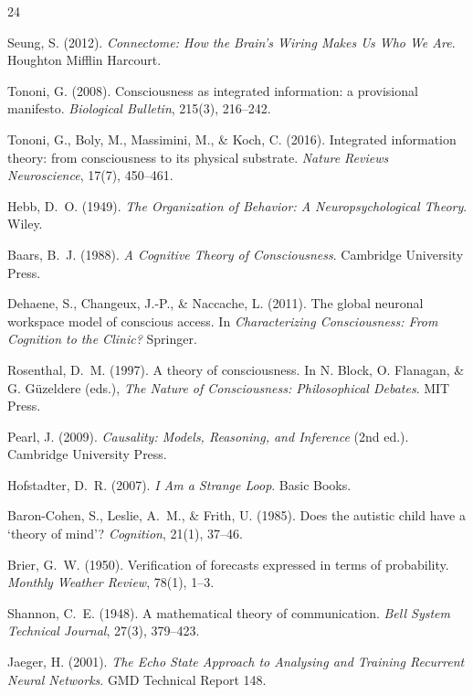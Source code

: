 \documentclass[11pt,a4paper]{article}
\begin{document}
\begin{thebibliography}{24}

Seung, S. (2012). \textit{Connectome: How the Brain's Wiring Makes Us Who We Are}.
Houghton Mifflin Harcourt.

Tononi, G. (2008). Consciousness as integrated information: a provisional manifesto.
\textit{Biological Bulletin}, 215(3), 216--242.

Tononi, G., Boly, M., Massimini, M., \& Koch, C. (2016). Integrated information theory:
from consciousness to its physical substrate. \textit{Nature Reviews Neuroscience},
17(7), 450--461.

Hebb, D.\ O. (1949). \textit{The Organization of Behavior: A Neuropsychological Theory}.
Wiley.

Baars, B.\ J. (1988). \textit{A Cognitive Theory of Consciousness}. Cambridge University
Press.

Dehaene, S., Changeux, J.-P., \& Naccache, L. (2011). The global neuronal workspace model
of conscious access. In \textit{Characterizing Consciousness: From Cognition to the
Clinic?} Springer.

Rosenthal, D.\ M. (1997). A theory of consciousness. In N. Block, O. Flanagan, \&
G. G\"uzeldere (eds.), \textit{The Nature of Consciousness: Philosophical Debates}. MIT
Press.

Pearl, J. (2009). \textit{Causality: Models, Reasoning, and Inference} (2nd ed.).
Cambridge University Press.

Hofstadter, D.\ R. (2007). \textit{I Am a Strange Loop}. Basic Books.

Baron-Cohen, S., Leslie, A.\ M., \& Frith, U. (1985). Does the autistic child have a
`theory of mind'? \textit{Cognition}, 21(1), 37--46.

Brier, G.\ W. (1950). Verification of forecasts expressed in terms of probability.
\textit{Monthly Weather Review}, 78(1), 1--3.

Shannon, C.\ E. (1948). A mathematical theory of communication. \textit{Bell System
Technical Journal}, 27(3), 379--423.

Jaeger, H. (2001). \textit{The Echo State Approach to Analysing and Training Recurrent
Neural Networks}. GMD Technical Report 148.


\end{thebibliography}
\end{document}
